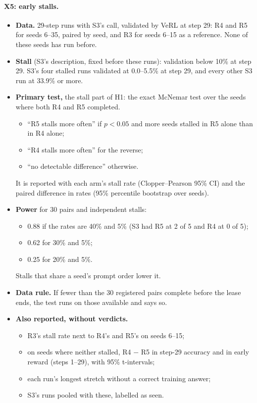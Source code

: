 \documentclass[11pt]{article}
\begin{document}
\paragraph{X5: early stalls.}
\begin{itemize}
\item \textbf{Data.} 29-step runs with S3's call, validated by VeRL at step 29: R4 and R5 for seeds 6--35, paired by seed, and R3 for seeds 6--15 as a reference. None of these seeds has run before.
\item \textbf{Stall} (S3's description, fixed before these runs): validation below 10\% at step 29. S3's four stalled runs validated at 0.0--5.5\% at step 29, and every other S3 run at 33.9\% or more.
\item \textbf{Primary test,} the stall part of H1: the exact McNemar test over the seeds where both R4 and R5 completed.
  \begin{itemize}
  \item ``R5 stalls more often'' if $p<0.05$ and more seeds stalled in R5 alone than in R4 alone;
  \item ``R4 stalls more often'' for the reverse;
  \item ``no detectable difference'' otherwise.
  \end{itemize}
  It is reported with each arm's stall rate (Clopper--Pearson 95\% CI) and the paired difference in rates (95\% percentile bootstrap over seeds).
\item \textbf{Power} for 30 pairs and independent stalls:
  \begin{itemize}
  \item 0.88 if the rates are 40\% and 5\% (S3 had R5 at 2 of 5 and R4 at 0 of 5);
  \item 0.62 for 30\% and 5\%;
  \item 0.25 for 20\% and 5\%.
  \end{itemize}
  Stalls that share a seed's prompt order lower it.
\item \textbf{Data rule.} If fewer than the 30 registered pairs complete before the lease ends, the test runs on those available and says so.
\item \textbf{Also reported, without verdicts.}
  \begin{itemize}
  \item R3's stall rate next to R4's and R5's on seeds 6--15;
  \item on seeds where neither stalled, R4 $-$ R5 in step-29 accuracy and in early reward (steps 1--29), with 95\% t-intervals;
  \item each run's longest stretch without a correct training answer;
  \item S3's runs pooled with these, labelled as seen.
  \end{itemize}
\end{itemize}
\end{document}
